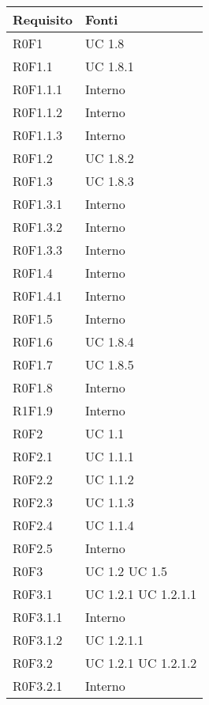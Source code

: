 	\begin{center}

	\def\arraystretch{1.5}
	\bgroup
	\begin{longtable}{| p{4cm} | p{4cm} |}

		\hline
		\textbf{Requisito} & \textbf{Fonti} \\
		\hline
		R0F1  & UC 1.8 \\
		\hline
		R0F1.1  &  UC 1.8.1 \\
		\hline
		R0F1.1.1  &  Interno \\
		\hline
		R0F1.1.2  &  Interno \\
		\hline
		R0F1.1.3  &  Interno \\
		\hline
		R0F1.2  &  UC 1.8.2 \\
		\hline
		R0F1.3  &  UC 1.8.3 \\
		\hline
		R0F1.3.1  &  Interno \\
		\hline
		R0F1.3.2  &  Interno \\
		\hline
		R0F1.3.3  &  Interno \\
		\hline
		R0F1.4  &  Interno \\
		\hline
		R0F1.4.1  &  Interno \\
		\hline
		R0F1.5  &  Interno \\
		\hline
		R0F1.6  &  UC 1.8.4 \\
		\hline
		R0F1.7  &  UC 1.8.5 \\
		\hline
		R0F1.8  &  Interno \\
		\hline
		R1F1.9  &  Interno \\
		\hline
		R0F2  &  UC 1.1 \\
		\hline
		R0F2.1  &  UC 1.1.1 \\
		\hline
		R0F2.2  &  UC 1.1.2 \\
		\hline
		R0F2.3  &  UC 1.1.3 \\
		\hline
		R0F2.4  &  UC 1.1.4 \\
		\hline
		R0F2.5  &  Interno  \\
		\hline
		R0F3  &  UC 1.2 \newline UC 1.5 \\
		\hline
		R0F3.1  &  UC 1.2.1 \newline UC 1.2.1.1 \\
		\hline
		R0F3.1.1  &  Interno \\
		\hline
		R0F3.1.2  &  UC 1.2.1.1 \\
		\hline
		R0F3.2  &  UC 1.2.1 \newline UC 1.2.1.2 \\
		\hline
		R0F3.2.1  &  Interno \\

\end{longtable}
\end{center}
